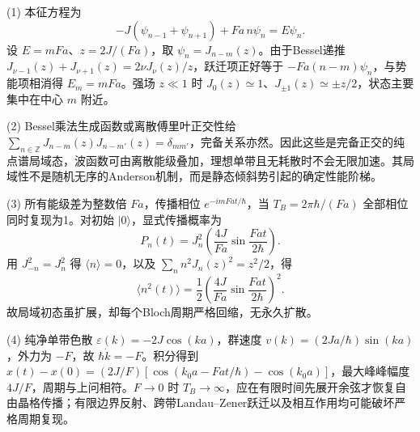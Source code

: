 (1) 本征方程为
\[
-J(\psi_{n-1}+\psi_{n+1})+Fa\,n\psi_n=E\psi_n.
\]
设 \(E=mFa\)、\(z=2J/(Fa)\)，取 \(\psi_n=J_{n-m}(z)\)。由于Bessel递推
\(J_{\nu-1}(z)+J_{\nu+1}(z)=2\nu J_\nu(z)/z\)，跃迁项正好等于 \(-Fa(n-m)\psi_n\)，与势能项相消得 \(\boxed{E_m=mFa}\)。强场 \(z\ll1\) 时 \(J_0(z)\simeq1\)、\(J_{\pm1}(z)\simeq\pm z/2\)，状态主要集中在中心 \(m\) 附近。

(2) Bessel乘法生成函数或离散傅里叶正交性给
\(\sum_{n\in\mathbb Z}J_{n-m}(z)J_{n-m'}(z)=\delta_{mm'}\)，完备关系亦然。因此这些是完备正交的纯点谱局域态，波函数可由离散能级叠加，理想单带且无耗散时不会无限加速。其局域性不是随机无序的Anderson机制，而是静态倾斜势引起的确定性能阶梯。

(3) 所有能级差为整数倍 \(Fa\)，传播相位 \(e^{-imFa t/\hbar}\)，当
\(\boxed{T_B=2\pi\hbar/(Fa)}\) 全部相位同时复现为1。对初始 \(|0\rangle\)，显式传播概率为
\[
P_n(t)=J_n^2\left(\frac{4J}{Fa}\sin\frac{Fa t}{2\hbar}\right).
\]
用 \(J_{-n}^2=J_n^2\) 得 \(\langle n\rangle=0\)，以及 \(\sum_n n^2J_n(z)^2=z^2/2\)，得
\[
\boxed{\langle n^2(t)\rangle=\frac12\left(\frac{4J}{Fa}\sin\frac{Fa t}{2\hbar}\right)^2}.
\]
故局域初态虽扩展，却每个Bloch周期严格回缩，无永久扩散。

(4) 纯净单带色散 \(\varepsilon(k)=-2J\cos(ka)\)，群速度 \(v(k)=(2Ja/\hbar)\sin(ka)\)，外力为 \(-F\)，故 \(\hbar\dot k=-F\)。积分得到
\(x(t)-x(0)=(2J/F)[\cos(k_0a-Fat/\hbar)-\cos(k_0a)]\)，最大峰峰幅度 \(4J/F\)，周期与上问相符。\(F\to0\) 时 \(T_B\to\infty\)，应在有限时间先展开余弦才恢复自由晶格传播；有限边界反射、跨带Landau–Zener跃迁以及相互作用均可能破坏严格周期复现。

